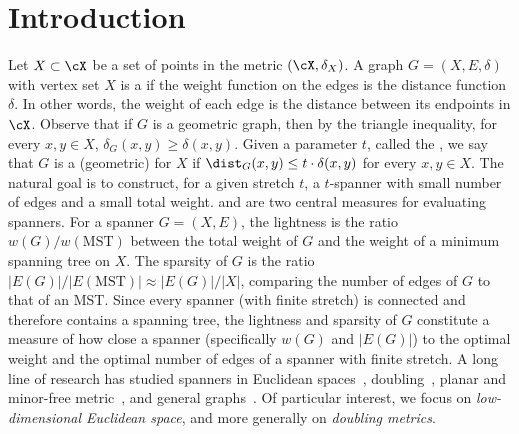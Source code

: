\section{Introduction}
Let $X\subset \cX$ be a set of points in the metric $(\cX,\delta_X)$. A graph $G= (X,E,\delta)$ with vertex set $X$ is a  if the weight function on the edges is the distance function $\delta$. In other words, the weight of each edge is the distance between its endpoints in $\cX$. Observe that if $G$ is a geometric graph, then by the triangle inequality, for every $x,y\in X$, $\delta_G(x,y)\geq \delta(x,y)$.  Given a parameter $t$, called the , we say that  $G$ is a (geometric)  for $X$ if $\dist_G(x,y)\leq t\cdot \delta(x,y)$ for every $x,y\in X$. The natural goal is to construct, for a given stretch $t$, a $t$-spanner with small number of edges and a small total weight.
%
 and  are two central measures for evaluating spanners. For a spanner $G=(X,E)$, the lightness is the ratio $w(G)/w(\mathrm{MST})$ between the total weight of $G$ and the weight of a minimum spanning tree on $X$. The sparsity of $G$ is the ratio $|E(G)|/|E(\mathrm{MST})| \approx |E(G)|/|X|$, comparing the number of edges of $G$ to that of an MST. 
Since every spanner (with finite stretch) is connected and therefore contains a spanning tree, the lightness and sparsity of $G$ 
constitute a measure of how close a spanner (specifically $w(G)$ and $|E(G)|$) to the optimal weight and the optimal number of edges of a spanner with finite stretch.
A long line of research has studied spanners in Euclidean spaces~\cite{arya1995euclidean, rao1998approximating,HarPeledIS13,
 ElkinS15,FiltserN22,BhoreT22,LeS25}, doubling~\cite{gao2004deformable,chan2009small,smid2009weak, gottlieb2015light, FS20, BLW19, BhoreM25}, planar and minor-free metric~\cite{borradaile2017minor, grigni2002light, cohen2020light, BhoreKK0LPT25}, and general graphs~\cite{peleg1989graph,althofer1993sparse,ElkinS16,ElkinNS15,chechik2018near,FS20,LeS23,Bodwin24}. 
Of particular interest, we focus on \emph{low-dimensional Euclidean space}, and more generally on \emph{doubling metrics}. 
%
%
%

